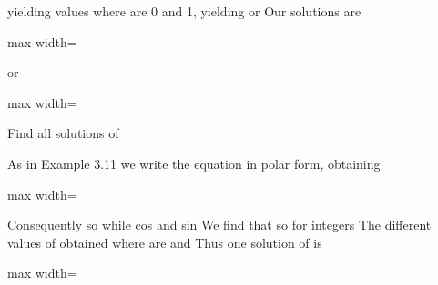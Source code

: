 \documentclass[11pt,oneside]{article}
\begin{document}
\begin{BookBody}

\noindent {} yielding values \BookInline{\theta } where \BookInline{0\leq \theta <2\pi } are 0 and 1, yielding  or  Our solutions are

\begin{center}\begin{adjustbox}{max width=\linewidth}\end{adjustbox}\end{center}

\noindent or

\begin{center}\begin{adjustbox}{max width=\linewidth}\end{adjustbox}\end{center} \BookEnd{\blacktriangle}

 Find all solutions of 

 As in Example 3.11 we write the equation in polar form, obtaining

\begin{center}\begin{adjustbox}{max width=\linewidth}\end{adjustbox}\end{center}

\noindent Consequently so  while cos  and sin  We find that  so  for integers  The different values of \BookInline{\theta } obtained where \BookInline{0\leq \theta <2\pi } are  and  Thus one solution of  is

\begin{center}\begin{adjustbox}{max width=\linewidth}\end{adjustbox}\end{center}


\end{BookBody}
\end{document}
